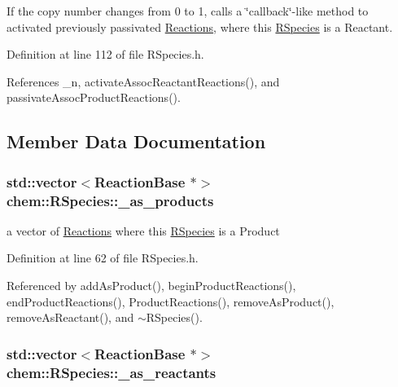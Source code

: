 If the copy number changes from 0 to 1, calls a \char`\"{}callback\char`\"{}-\/like method to activated previously passivated \hyperlink{classchem_1_1Reaction}{Reactions}, where this \hyperlink{classchem_1_1RSpecies}{R\-Species} is a Reactant. 

Definition at line 112 of file R\-Species.\-h.



References \-\_\-n, activate\-Assoc\-Reactant\-Reactions(), and passivate\-Assoc\-Product\-Reactions().



\subsection{Member Data Documentation}
\hypertarget{classchem_1_1RSpecies_ad4d3712865ed15fd9b581810ffe1b0e7}{
\subsubsection[{\-\_\-as\-\_\-products}]{\setlength{\rightskip}{0pt plus 5cm}std\-::vector$<${\bf Reaction\-Base} $\ast$$>$ {\bf chem\-::\-R\-Species\-::\-\_\-as\-\_\-products}}}\label{classchem_1_1RSpecies_ad4d3712865ed15fd9b581810ffe1b0e7}


a vector of \hyperlink{classchem_1_1Reaction}{Reactions} where this \hyperlink{classchem_1_1RSpecies}{R\-Species} is a Product 



Definition at line 62 of file R\-Species.\-h.



Referenced by add\-As\-Product(), begin\-Product\-Reactions(), end\-Product\-Reactions(), Product\-Reactions(), remove\-As\-Product(), remove\-As\-Reactant(), and $\sim$\-R\-Species().

\hypertarget{classchem_1_1RSpecies_a7ffda464bbe610c372cac83e6e735023}{
\subsubsection[{\-\_\-as\-\_\-reactants}]{\setlength{\rightskip}{0pt plus 5cm}std\-::vector$<${\bf Reaction\-Base} $\ast$$>$ {\bf chem\-::\-R\-Species\-::\-\_\-as\-\_\-reactants}}}\label{classchem_1_1RSpecies_a7ffda464bbe610c372cac83e6e735023}


